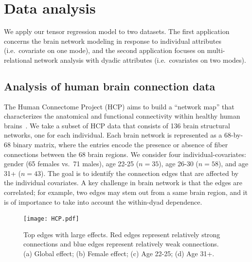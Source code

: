 \documentclass[12pt]{article}
\theoremstyle{plain}
\theoremstyle{definition}
\begin{document}
\section{Data analysis}
We apply our tensor regression model to two datasets. The first application concerns the brain network modeling in response to individual attributes (i.e.\ covariate on one mode), and the second application focuses on multi-relational network analysis with dyadic attributes (i.e.\ covariates on two modes). 

\subsection{Analysis of human brain connection data}
The Human Connectome Project (HCP) aims to build a ``network map'' that characterizes the anatomical and functional connectivity within healthy human brains~\citep{HCP}. We take a subset of HCP data that consists of 136 brain structural networks, one for each individual. Each brain network is represented as a 68-by-68 binary matrix, where the entries encode the presence or absence of fiber connections between the 68 brain regions. We consider four individual-covariates: gender (65 females vs.\ 71 males), age 22-25 ($n=35$), age 26-30 ($n=58$), and age 31+ ($n=43$). The goal is to identify the connection edges that are affected by the individual covariates. A key challenge in brain network is that the edges are correlated; for example, two edges may stem out from a same brain region, and it is of importance to take into account the within-dyad dependence. 


\begin{figure}[hbt]
\centering
\texttt{[image: HCP.pdf]}
\caption{Top edges with large effects. Red edges represent relatively strong connections and blue edges represent relatively weak connections. (a) Global effect; (b) Female effect; (c) Age 22-25; (d) Age 31+.}\label{fig:brain}
\end{figure}
\end{document}
